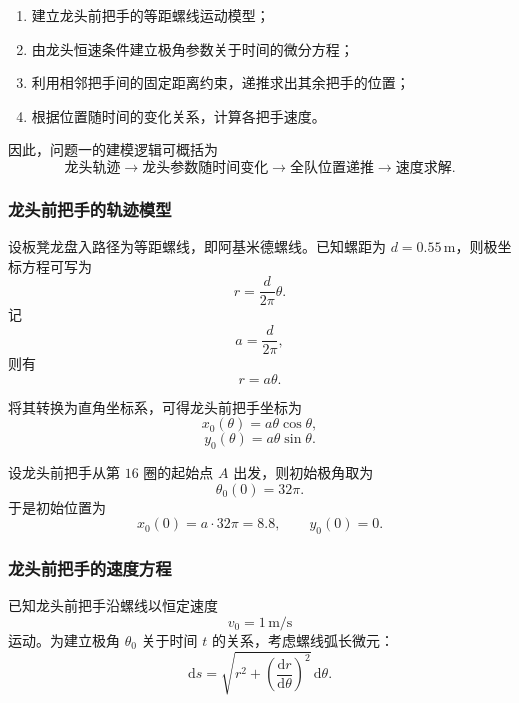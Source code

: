 \documentclass[12pt,a4paper]{ctexart}
\begin{document}
\begin{enumerate}
    \item 建立龙头前把手的等距螺线运动模型；
    \item 由龙头恒速条件建立极角参数关于时间的微分方程；
    \item 利用相邻把手间的固定距离约束，递推求出其余把手的位置；
    \item 根据位置随时间的变化关系，计算各把手速度。
\end{enumerate}

因此，问题一的建模逻辑可概括为
\[
\text{龙头轨迹} \longrightarrow \text{龙头参数随时间变化} \longrightarrow \text{全队位置递推} \longrightarrow \text{速度求解}.
\]

\subsubsection{龙头前把手的轨迹模型}
设板凳龙盘入路径为等距螺线，即阿基米德螺线。已知螺距为 $d=0.55\,\mathrm{m}$，则极坐标方程可写为
\begin{equation}
r=\frac{d}{2\pi}\theta.
\end{equation}
记
\[
a=\frac{d}{2\pi},
\]
则有
\begin{equation}
r=a\theta.
\end{equation}

将其转换为直角坐标系，可得龙头前把手坐标为
\begin{equation}
x_0(\theta)=a\theta\cos\theta,
\end{equation}
\begin{equation}
y_0(\theta)=a\theta\sin\theta.
\end{equation}

设龙头前把手从第 $16$ 圈的起始点 $A$ 出发，则初始极角取为
\begin{equation}
\theta_0(0)=32\pi.
\end{equation}
于是初始位置为
\begin{equation}
x_0(0)=a\cdot 32\pi=8.8,\qquad y_0(0)=0.
\end{equation}

\subsubsection{龙头前把手的速度方程}
已知龙头前把手沿螺线以恒定速度
\[
v_0=1\,\mathrm{m/s}
\]
运动。为建立极角 $\theta_0$ 关于时间 $t$ 的关系，考虑螺线弧长微元：
\begin{equation}
\mathrm{d}s=\sqrt{r^2+\left(\frac{\mathrm{d}r}{\mathrm{d}\theta}\right)^2}\,\mathrm{d}\theta.
\end{equation}
\end{document}
